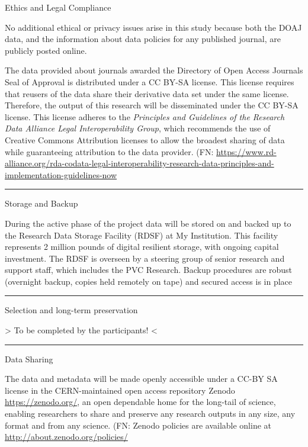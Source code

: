 \documentclass[]{article}
\begin{document}
Ethics and Legal Compliance

No additional ethical or privacy issues arise in this study because both
the DOAJ data, and the information about data policies for any published
journal, are publicly posted online.

The data provided about journals awarded the Directory of Open Access
Journals Seal of Approval is distributed under a CC BY-SA license. This
license requires that reusers of the data share their derivative data
set under the same license. Therefore, the output of this research will
be disseminated under the CC BY-SA license. This license adheres to the
\emph{Principles and Guidelines of the Research Data Alliance Legal
Interoperability Group}, which recommends the use of Creative Commons
Attribution licenses to allow the broadest sharing of data while
guaranteeing attribution to the data provider. (FN:
\url{https://www.rd-alliance.org/rda-codata-legal-interoperability-research-data-principles-and-implementation-guidelines-now}

\begin{center}\rule{0.5\linewidth}{\linethickness}\end{center}

Storage and Backup

During the active phase of the project data will be stored on and backed
up to the Research Data Storage Facility (RDSF) at My Institution. This
facility represents 2 million pounds of digital resilient storage, with
ongoing capital investment. The RDSF is overseen by a steering group of
senior research and support staff, which includes the PVC Research.
Backup procedures are robust (overnight backup, copies held remotely on
tape) and secured access is in place

\begin{center}\rule{0.5\linewidth}{\linethickness}\end{center}

Selection and long-term preservation

\textbar{}\textbar{}\textgreater{} To be completed by the participants!
\textless{}\textbar{}\textbar{}

\begin{center}\rule{0.5\linewidth}{\linethickness}\end{center}

Data Sharing

The data and metadata will be made openly accessible under a CC-BY SA
license in the CERN-maintained open access repository Zenodo
\url{https://zenodo.org/}, an open dependable home for the long-tail of
science, enabling researchers to share and preserve any research outputs
in any size, any format and from any science. (FN: Zenodo policies are
available online at \url{http://about.zenodo.org/policies/}
\end{document}
